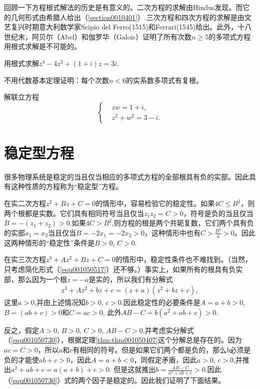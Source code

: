 回顾一下方程根式解法的历史是有意义的。二次方程的求解由Hindus发现。而它的几何形式由希腊人给出（\ref{section0010401}）.三次方程和四次方程的求解是由文艺复兴时期意大利数学家Scipio del Ferro(1515)和Ferrari(1545)给出。此外，十八世纪末，阿贝尔（Abel）和伽罗华（Galois）证明了所有次数$n \ge 5$的多项式方程用根式求解是不可能的。

\begin{problemset}
\item 用根式求解$z^4 - 4z^3 + (1 + i)z = 3i$.

\item 不用代数基本定理证明：每个次数$n<6$的实系数多项式有复根。

\item 解联立方程
\[
\left\{
\begin{aligned}
&zw = 1 + i,\\
&z^2 + w^2 = 3- i.
\end{aligned}
\right.
\]
\end{problemset}



\section{稳定型方程}\label{section0010507}
很多物理系统是稳定的当且仅当相应的多项式方程的全部根具有负的实部。因此具有这种性质的方程称为“稳定型”方程。

在实二次方程$z^2 + Bz + C = 0$的情形中，容易检验它的稳定性。如果$4C \le B^2$，则两个根都是实数。它们具有相同符号当且仅当$z_1z_2 = C > 0$，符号是负的当且仅当$B = -(z_1+z_2) > 0$.如果$4C > B^2$,则方程的根是两个共轭复数，它们两个具有负的实部$x_1=x_2$当且仅当$B = -2x_1 = -2x_2 > 0$，这种情形中也有$C > \frac{B^2}{4} > 0$。因此这两种情形的“稳定性”条件是$B>0$, $C>0$.

在实三次方程$z^3 + Az^2 + Bz + C = 0$的情形中，稳定性条件也不难找到。（当然，只考虑简化形式（\ref{equ001050517}）还不够。）事实上，如果所有的根具有负实部，那么因为一个根$z = -a$是实的，所以我们有分解式
\begin{gather}\label{equ001050730}
z^3+Az^2+bz+c = (z+a)(z^2+bz+c),
\end{gather}
这里$a > 0$,并由上述情况知$b>0$, $c>0$.因此稳定性的必要条件是$A = a+b>0$, $B = (ab+c) > 0$和$C=ac>0$, 此外$AB-C = b(a^2+ab+c) > 0$.

反之，假定$A > 0$, $B > 0$, $C > 0$, $AB-C>0$,并考虑实分解式（\ref{equ001050730}），根据定理\ref{thm:thm001050407}这个分解总是存在的。因为$ac = C > 0$，所以$a$和$c$有相同的符号。但是如果它们两个都是负的，那么$b$必须是负的才能使$ab+c>0$，因此$A = a + b < 0$，同假定矛盾，因此$a > 0$, $c > 0$,并推出$a^2 + ab + c = a(a+b) + c > 0$. 但是这就推出$b = \frac{AB-C}{a^2+ab+c} > 0$.因此（\ref{equ001050730}）式的两个因子是稳定的。因此我们证明了下面结果。

